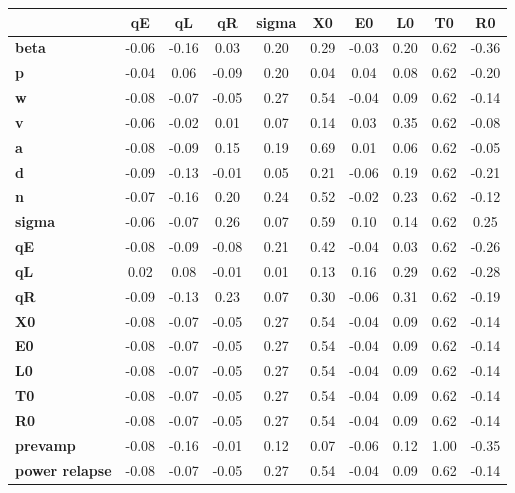 \begin{tiny}\begin{tabular}{|l|c|c|c|c|c|c|c|c|c|}
\hline
&\textbf{qE}&\textbf{qL}&\textbf{qR}&\textbf{sigma}&\textbf{X0}&\textbf{E0}&\textbf{L0}&\textbf{T0}&\textbf{R0}\\\hline
\textbf{beta}&-0.06&-0.16&0.03&0.20&0.29&-0.03&0.20&0.62&-0.36\\\hline
\textbf{p}&-0.04&0.06&-0.09&0.20&0.04&0.04&0.08&0.62&-0.20\\\hline
\textbf{w}&-0.08&-0.07&-0.05&0.27&0.54&-0.04&0.09&0.62&-0.14\\\hline
\textbf{v}&-0.06&-0.02&0.01&0.07&0.14&0.03&0.35&0.62&-0.08\\\hline
\textbf{a}&-0.08&-0.09&0.15&0.19&0.69&0.01&0.06&0.62&-0.05\\\hline
\textbf{d}&-0.09&-0.13&-0.01&0.05&0.21&-0.06&0.19&0.62&-0.21\\\hline
\textbf{n}&-0.07&-0.16&0.20&0.24&0.52&-0.02&0.23&0.62&-0.12\\\hline
\textbf{sigma}&-0.06&-0.07&0.26&0.07&0.59&0.10&0.14&0.62&0.25\\\hline
\textbf{qE}&-0.08&-0.09&-0.08&0.21&0.42&-0.04&0.03&0.62&-0.26\\\hline
\textbf{qL}&0.02&0.08&-0.01&0.01&0.13&0.16&0.29&0.62&-0.28\\\hline
\textbf{qR}&-0.09&-0.13&0.23&0.07&0.30&-0.06&0.31&0.62&-0.19\\\hline
\textbf{X0}&-0.08&-0.07&-0.05&0.27&0.54&-0.04&0.09&0.62&-0.14\\\hline
\textbf{E0}&-0.08&-0.07&-0.05&0.27&0.54&-0.04&0.09&0.62&-0.14\\\hline
\textbf{L0}&-0.08&-0.07&-0.05&0.27&0.54&-0.04&0.09&0.62&-0.14\\\hline
\textbf{T0}&-0.08&-0.07&-0.05&0.27&0.54&-0.04&0.09&0.62&-0.14\\\hline
\textbf{R0}&-0.08&-0.07&-0.05&0.27&0.54&-0.04&0.09&0.62&-0.14\\\hline
\textbf{prevamp}&-0.08&-0.16&-0.01&0.12&0.07&-0.06&0.12&1.00&-0.35\\\hline
\textbf{power relapse}&-0.08&-0.07&-0.05&0.27&0.54&-0.04&0.09&0.62&-0.14\\\hline
\end{tabular}
\end{tiny}